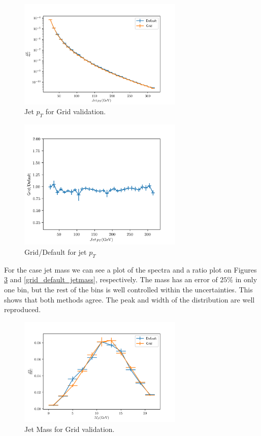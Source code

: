 \begin{figure}
\includegraphics[width=0.7\textwidth]{images/grid_jetpt_validation.png}
\caption[Jet $p_T$ for Grid validation.]{Jet $p_T$ for Grid validation.}
\label{grid_jetpt_validation}
\end{figure}

\begin{figure}
\includegraphics[width=0.7\textwidth]{images/grid_default_jetpt.png}
\caption[Grid/Default for jet $p_T$]{Grid/Default for jet $p_T$}
\label{grid_default}
\end{figure}

For the case jet mass we can see a plot of the spectra and a ratio plot on Figures \ref{grid_jetmass_validation} and \ref{grid_default_jetmass}, respectively. The mass has an error of $25\%$ in only one bin, but the rest of the bins is well controlled within the uncertainties. This shows that both methods agree. The peak and width of the distribution are well reproduced.

\begin{figure}
\includegraphics[width=0.7\textwidth]{images/grid_mass_validation.png}
\caption[Jet Mass for Grid validation.]{Jet Mass for Grid validation.}
\label{grid_jetmass_validation}
\end{figure}

